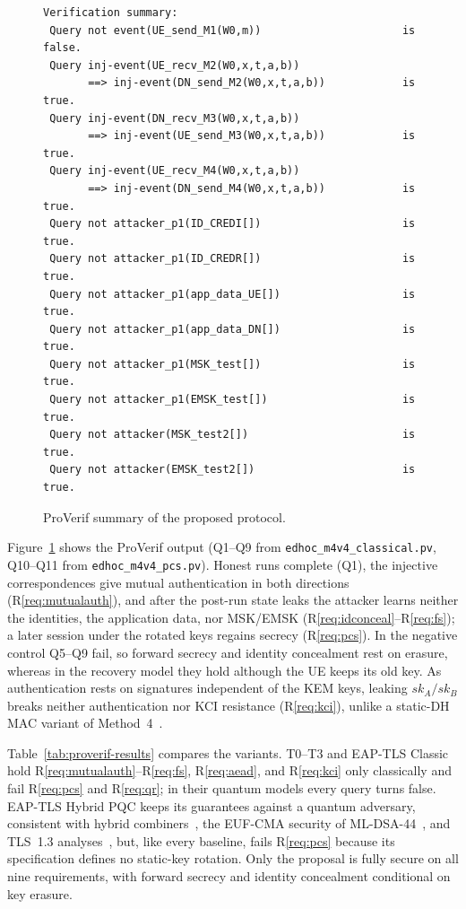 \documentclass[symmetry,article,submit,moreauthors]{Definitions/mdpi}
\begin{document}
\begin{figure}[H]
\begin{lstlisting}[style=proverifbox]
Verification summary:
 Query not event(UE_send_M1(W0,m))                      is false.
 Query inj-event(UE_recv_M2(W0,x,t,a,b))
       ==> inj-event(DN_send_M2(W0,x,t,a,b))            is true.
 Query inj-event(DN_recv_M3(W0,x,t,a,b))
       ==> inj-event(UE_send_M3(W0,x,t,a,b))            is true.
 Query inj-event(UE_recv_M4(W0,x,t,a,b))
       ==> inj-event(DN_send_M4(W0,x,t,a,b))            is true.
 Query not attacker_p1(ID_CREDI[])                      is true.
 Query not attacker_p1(ID_CREDR[])                      is true.
 Query not attacker_p1(app_data_UE[])                   is true.
 Query not attacker_p1(app_data_DN[])                   is true.
 Query not attacker_p1(MSK_test[])                      is true.
 Query not attacker_p1(EMSK_test[])                     is true.
 Query not attacker(MSK_test2[])                        is true.
 Query not attacker(EMSK_test2[])                       is true.
\end{lstlisting}
\caption{ProVerif summary of the proposed protocol.\label{fig:proverif-transcript}}
\end{figure}

Figure~\ref{fig:proverif-transcript} shows the ProVerif output (Q1--Q9 from \texttt{edhoc\_m4v4\_classical.pv}, Q10--Q11 from \texttt{edhoc\_m4v4\_pcs.pv}). Honest runs complete (Q1), the injective correspondences give mutual authentication in both directions (R\ref{req:mutualauth}), and after the post-run state leaks the attacker learns neither the identities, the application data, nor MSK/EMSK (R\ref{req:idconceal}--R\ref{req:fs}); a later session under the rotated keys regains secrecy (R\ref{req:pcs}). In the negative control Q5--Q9 fail, so forward secrecy and identity concealment rest on erasure, whereas in the recovery model they hold although the UE keeps its old key. As authentication rests on signatures independent of the KEM keys, leaking $sk_A/sk_B$ breaks neither authentication nor KCI resistance (R\ref{req:kci}), unlike a static-DH MAC variant of Method~4~\cite{GM23,CDM24}.

Table~\ref{tab:proverif-results} compares the variants. T0--T3 and EAP-TLS Classic hold R\ref{req:mutualauth}--R\ref{req:fs}, R\ref{req:aead}, and R\ref{req:kci} only classically and fail R\ref{req:pcs} and R\ref{req:qr}; in their quantum models every query turns false. EAP-TLS Hybrid PQC keeps its guarantees against a quantum adversary, consistent with hybrid combiners~\cite{BBF+19,XWing}, the EUF-CMA security of ML-DSA-44~\cite{FIPS204}, and TLS~1.3 analyses~\cite{cremers2017symbolic}, but, like every baseline, fails R\ref{req:pcs} because its specification defines no static-key rotation. Only the proposal is fully secure on all nine requirements, with forward secrecy and identity concealment conditional on key erasure.
\end{document}
